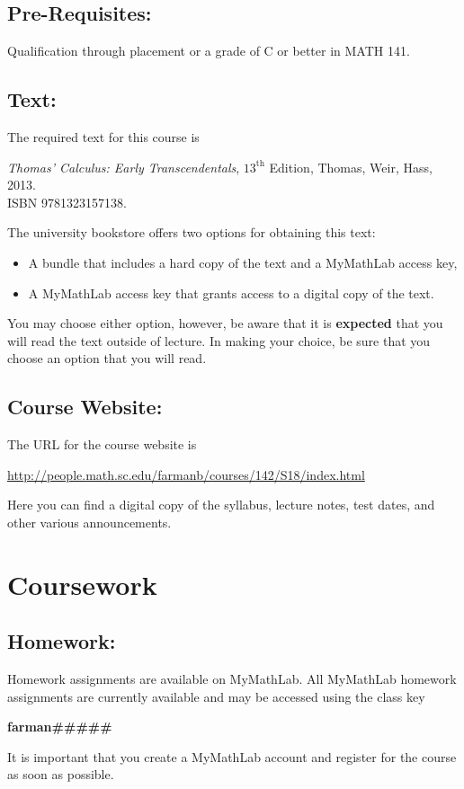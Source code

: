 \documentclass[10pt]{amsart}
\begin{document}
\subsection*{Pre-Requisites:} Qualification through placement or a grade of C or better in MATH 141.\\
\subsection*{Text:}
The required text for this course is\\
\begin{center}
  {\it Thomas' Calculus: Early Transcendentals}, $13^{\text{th}}$ Edition, Thomas, Weir, Hass, 2013.  \\ISBN 9781323157138.
\end{center}

\noindent
The university bookstore offers two options for obtaining this text:
\begin{itemize}
\item
  A bundle that includes a hard copy of the text and a MyMathLab access key,
\item
  A MyMathLab access key that grants access to a digital copy of the text.
\end{itemize}
You may choose either option, however, be aware that it is {\bf expected} that you will read the text outside of lecture.
In making your choice, be sure that you choose an option that you will read.

\subsection*{Course Website:} The URL for the course website is
\begin{center}
  \url{http://people.math.sc.edu/farmanb/courses/142/S18/index.html}
\end{center}
Here you can find a digital copy of the syllabus, lecture notes, test dates, and other various announcements.

\section*{Coursework}
\noindent
\subsection*{Homework:}
Homework assignments are available on MyMathLab.
All MyMathLab homework assignments are currently available and may be accessed using the class key
\begin{center}
  {\bf farman\#\#\#\#\#}
\end{center}
It is important that you create a MyMathLab account and register for the course as soon as possible.
\end{document}

